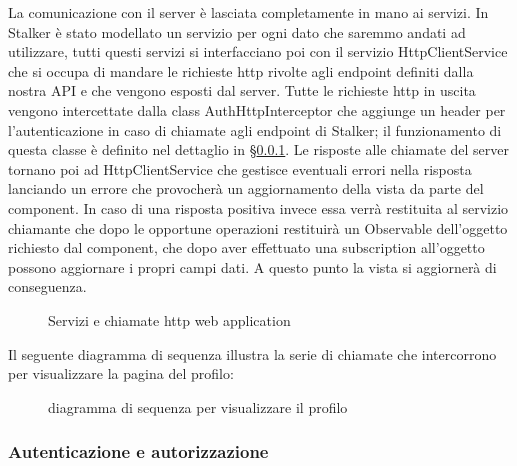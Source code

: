 \documentclass[../../manuale-manutentore.tex]{subfiles}
\begin{document}
La comunicazione con il server è lasciata completamente in mano ai servizi.
In Stalker è stato modellato un servizio per ogni dato che saremmo andati ad utilizzare, tutti questi servizi si interfacciano poi con il servizio HttpClientService che si occupa di mandare le richieste http rivolte agli endpoint definiti dalla nostra API e che vengono esposti dal server.
Tutte le richieste http in uscita vengono intercettate dalla class AuthHttpInterceptor che aggiunge un header per l'autenticazione in caso di chiamate agli endpoint di Stalker; il funzionamento di questa classe è definito nel dettaglio in §\ref{subs:autenticazione}.
Le risposte alle chiamate del server tornano poi ad HttpClientService che gestisce eventuali errori nella risposta lanciando un errore che provocherà un aggiornamento della vista da parte del component. In caso di una risposta positiva invece essa verrà restituita al servizio chiamante che dopo le opportune operazioni restituirà un Observable dell'oggetto richiesto dal component, che dopo aver effettuato una subscription all'oggetto possono aggiornare i propri campi dati.
A questo punto la vista si aggiornerà di conseguenza.

\begin{figure}[H]
  \centering
  \caption{Servizi e chiamate http web application}%
  \label{fig:web-app-http-calls}
\end{figure}

Il seguente diagramma di sequenza illustra la serie di chiamate che intercorrono per visualizzare la pagina del profilo:
\begin{figure}[H]
  \centering
  \caption{diagramma di sequenza per visualizzare il profilo}%
  \label{fig:web-app-http-call-sequence}
\end{figure}

\subsubsection{Autenticazione e autorizzazione}%
\label{subs:autenticazione}
\end{document}
